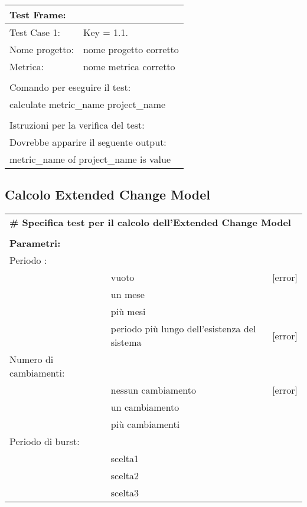 \vspace{1cm}

\begin{tabular}{ll}
\hline
\multicolumn{2}{l}{ \textbf{Test Frame:} }							\\
\hline
Test Case 1:		&	{Key = 1.1.}								\\
Nome progetto:		&	nome progetto corretto						\\
Metrica:			&	nome metrica corretto						\\
\multicolumn{2}{l}{ }												\\
\multicolumn{2}{l}{ Comando per eseguire il test: }					\\
\multicolumn{2}{l}{ calculate metric\_name project\_name }			\\
\multicolumn{2}{l}{ }												\\
\multicolumn{2}{l}{ Istruzioni per la verifica del test: }			\\
\multicolumn{2}{l}{ Dovrebbe apparire il seguente output: }			\\
\multicolumn{2}{l}{ metric\_name of project\_name is value }		\\
\hline
\end{tabular}

\clearpage

\subsection{Calcolo Extended Change Model}

\begin{tabular}{lp{6cm}l}
\multicolumn{3}{l}{ \textbf{\# Specifica test per il calcolo dell'Extended Change Model} }		\\
\multicolumn{3}{l}{ }																			\\
\textbf{Parametri:}		& 													&					\\
Periodo	:				&													&					\\
						&	vuoto											&	[error]			\\
						&	un mese											&					\\
						&	più mesi										&					\\
						&	periodo più lungo dell'esistenza del sistema	&	[error]			\\
Numero di cambiamenti:	&													&					\\
						&	nessun cambiamento								&	[error]			\\
						&	un cambiamento									&					\\
						&	più cambiamenti									&					\\
Periodo di burst:		&													&					\\
						&	scelta1											&					\\
						&	scelta2											&					\\
						&	scelta3											&					\\
\end{tabular}

\vspace{1cm}